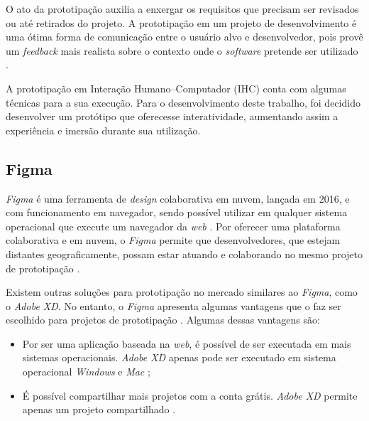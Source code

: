 O ato da prototipação auxilia a enxergar os requisitos que precisam ser revisados ou até retirados do projeto. A prototipação em um projeto de desenvolvimento é uma ótima forma de comunicação entre o usuário alvo e desenvolvedor, pois provê um \textit{feedback} mais realista sobre o contexto onde o \textit{software} pretende ser utilizado \cite{prototipacao}.

A prototipação em Interação Humano–Computador (IHC) conta com algumas técnicas para a sua execução. Para o desenvolvimento deste trabalho, foi decidido desenvolver um protótipo que oferecesse interatividade, aumentando assim a experiência e imersão durante sua utilização.

\subsection{Figma}

\textit{Figma} é uma ferramenta de \textit{design} colaborativa em nuvem, lançada em 2016, e com funcionamento em navegador, sendo possível utilizar em qualquer sistema operacional que execute um navegador da \textit{web} \cite{nguyen}. Por oferecer uma plataforma colaborativa e em nuvem, o \textit{Figma} permite que desenvolvedores, que estejam distantes geograficamente, possam estar atuando e colaborando no mesmo projeto de prototipação \cite{nascimento}.

Existem outras soluções para prototipação no mercado similares ao \textit{Figma}, como o \textit{Adobe XD}. No entanto, o \textit{Figma} apresenta algumas vantagens que o faz ser escolhido para projetos de prototipação \cite{teplov}. Algumas dessas vantagens são:

\begin{itemize}
    \item Por ser uma aplicação baseada na \textit{web}, é possível de ser executada em mais sistemas operacionais. \textit{Adobe XD} apenas pode ser executado em sistema operacional \textit{Windows} e \textit{Mac} \cite{teplov};
    \item É possível compartilhar mais projetos com a conta grátis. \textit{Adobe XD} permite apenas um projeto compartilhado \cite{teplov}.
\end{itemize}